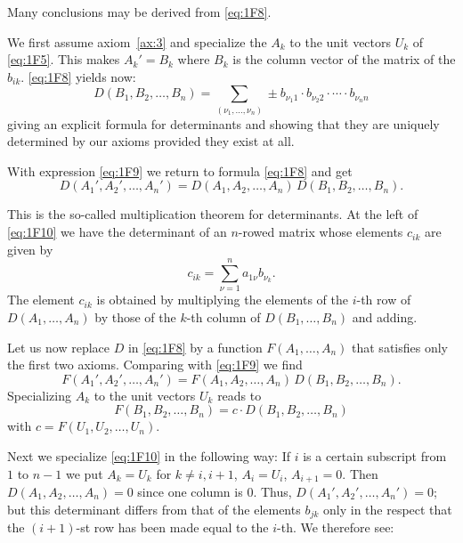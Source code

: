 \documentclass[10pt,leqno,a5paper]{book}
\theoremstyle{definition}
\begin{document}
Many conclusions may be derived from \eqref{eq:1F8}.

We first assume axiom~\ref{ax:3} and specialize the $A_k$ to the unit vectors $U_k$ of \eqref{eq:1F5}.
This makes $A_k' = B_k$ where $B_k$ is the column vector of the matrix of the $b_{ik}$. \eqref{eq:1F8} yields now:
\begin{equation}
\label{eq:1F9}
D(B_1, B_2, \ldots, B_n)
=
\!\!\!
\sum_{(\nu_1, \ldots, \nu_n)}
\!\!\!\!
\pm b_{\nu_1 1} \cdot b_{\nu_2 2} \cdot \cdots \cdot b_{\nu_n n}
\end{equation}
giving an explicit formula for determinants and showing that they are uniquely determined by our axioms provided they exist at all.

With expression \eqref{eq:1F9} we return to formula \eqref{eq:1F8} and get
\begin{equation}
\label{eq:1F10}
D(A_1', A_2', \ldots, A_n')
=
D(A_1, A_2, \ldots, A_n)
\,
D(B_1, B_2, \ldots, B_n).
\end{equation}

This is the so-called multiplication theorem for determin\-ants.
At the left of \eqref{eq:1F10} we have the determinant of an $n$-rowed matrix whose elements $c_{ik}$ are given by
\begin{equation}
\label{eq:1F11}
c_{ik} = \sum_{\nu=1}^n a_{1\nu} b_{\nu_k}.
\end{equation}
The element $c_{ik}$ is obtained by multiplying the elements of the $i$-th row of $D(A_1, \ldots, A_n)$ by those of the $k$-th column of $D(B_1, \ldots, B_n)$ and adding.

Let us now replace $D$ in \eqref{eq:1F8} by a function $F(A_1, \ldots, A_n)$ that satisfies only the first two axioms.
Comparing with \eqref{eq:1F9} we find
\[
F(A_1', A_2', \ldots, A_n')
=
F(A_1, A_2, \ldots, A_n)
\,
D(B_1, B_2, \ldots, B_n).
\]
Specializing $A_k$ to the unit vectors $U_k$ reads to
\begin{equation}
\label{eq:1F12}
F(B_1, B_2, \ldots, B_n)
= c \cdot D(B_1, B_2, \ldots, B_n)
\end{equation}
with $c = F(U_1, U_2, \ldots, U_n)$.

Next we specialize \eqref{eq:1F10} in the following way:
If $i$ is a certain subscript from $1$ to $n-1$ we put $A_k = U_k$ for $k\not=i,i+1$, $A_i = U_i$, $A_{i+1} = 0$.
Then $D(A_1, A_2, \ldots, A_n) = 0$ since one column is $0$.
Thus, $D(A_1', A_2', \ldots, A_n') = 0$; but this determinant differs from that of the elements $b_{jk}$ only in the respect that the $(i+1)$-st row has been made equal to the $i$-th. We therefore see:
\end{document}
